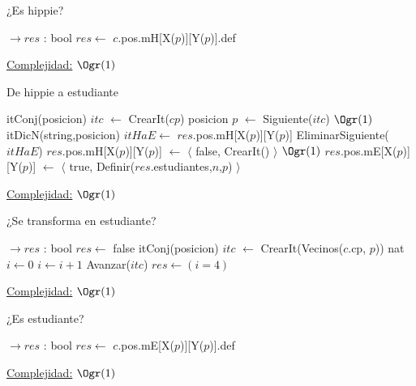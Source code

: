 \begin{Algoritmos}
\begin{algorithm}[H]
\caption{¿Es hippie?}
\begin{algorithmic}[1]
	 $\to res$ : bool
	\State $res \gets$ $c$.pos.mH[X($p$)][Y($p$)].def
	\EndProcedure
\end{algorithmic}
\underline{Complejidad:} $\Ogr(1)$
\end{algorithm}


\begin{algorithm}[H]
\caption{De hippie a estudiante}
\begin{algorithmic}[1]
	\State itConj(posicion) $itc$ $\gets$ CrearIt($cp$)
	\State posicion $p$ $\gets$ Siguiente($itc$)
	 \Comment $\Ogr(1)$
		\State itDicN(string,posicion) $itHaE \gets$ $res$.pos.mH[X($p$)][Y($p$)]
		\State EliminarSiguiente($itHaE$)
		\State $res$.pos.mH[X($p$)][Y($p$)] $\gets$ $\langle$ false, CrearIt() $\rangle$ \Comment $\Ogr(1)$
		\State $res$.pos.mE[X($p$)][Y($p$)] $\gets$ $\langle$ true, Definir($res$.estudiantes,$n$,$p$) $\rangle$
	\EndIf
	\EndWhile
	\EndProcedure
\end{algorithmic}
\underline{Complejidad:} $\Ogr(1)$
\end{algorithm}

\begin{algorithm}[H]
\caption{¿Se transforma en estudiante?}
\begin{algorithmic}[1]
	 $\to res$ : bool
	\State $res \gets$ false
	\State itConj(posicion) $itc$ $\gets$ CrearIt(Vecinos($c$.cp, $p$))
	\State nat $i \gets 0$
			\State $i \gets i+1$
		\EndIf
		\State Avanzar($itc$)
	\EndWhile
	$res \gets (i = 4)$
	\EndProcedure
\end{algorithmic}
\underline{Complejidad:} $\Ogr(1)$
\end{algorithm}


\begin{algorithm}[H]
\caption{¿Es estudiante?}
\begin{algorithmic}[1]
	 $\to res$ : bool
	\State $res \gets$ $c$.pos.mE[X($p$)][Y($p$)].def
	\EndProcedure
\end{algorithmic}
\underline{Complejidad:} $\Ogr(1)$
\end{algorithm}



\end{Algoritmos}
